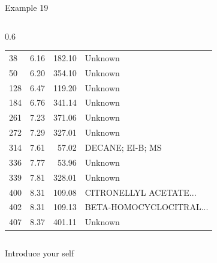 \documentclass[aspectratio=169]{beamer}
\begin{document}
\begin{frame}{Example 19}
\begin{columns}[t]
\begin{column}{0.6\textwidth}
\begin{table}[htp!]
\begin{tabular}{lrrl}
                        38 & 6.16 & 182.10 & Unknown \\
                        50 & 6.20 & 354.10 & Unknown \\
                        128 & 6.47 & 119.20 & Unknown \\
                        184 & 6.76 & 341.14 & Unknown \\
                        261 & 7.23 & 371.06 & Unknown \\
                        272 & 7.29 & 327.01 & Unknown \\
                        314 & 7.61 & 57.02 & DECANE; EI-B; MS \\
                        336 & 7.77 & 53.96 & Unknown \\
                        339 & 7.81 & 328.01 & Unknown \\
                        400 & 8.31 & 109.08 & CITRONELLYL ACETATE... \\ %
                        402 & 8.31 & 109.13 & BETA-HOMOCYCLOCITRAL... \\ %
                        407 & 8.37 & 401.11 & Unknown \\\bottomrule
                    \end{tabular}
                \end{table}
            \end{column}
        \end{columns}

        \begin{note}
            {Introduce your self}
        \end{note}
    \end{frame}
\end{document}
